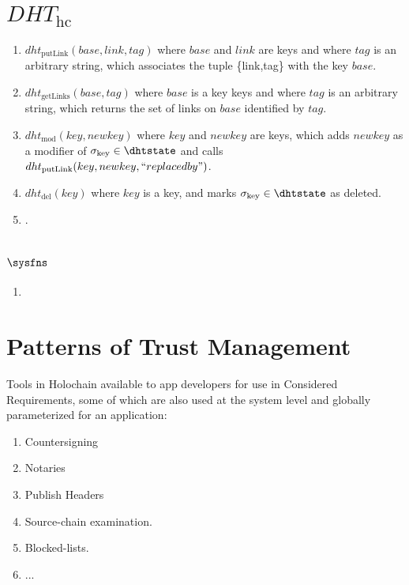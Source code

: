 \documentclass[twocolumn,showpacs,
  nofootinbib,aps,superscriptaddress,
  eqsecnum,prd,notitlepage,showkeys,10pt]{revtex4-1}
\begin{document}
\section{$DHT_\text{hc}$}
\label{apdx:dhtfn}
\begin{enumerate}

\item $dht_\text{putLink}(base,link,tag)$ where $base$ and $link$ are keys and where $tag$ is an arbitrary string, which associates the tuple \{link,tag\} with the key $base$.
\item $dht_\text{getLinks}(base,tag)$ where $base$ is a key keys and where $tag$ is an arbitrary string, which returns the set of links on $base$ identified by $tag$.
\item $dht_\text{mod}(key,newkey)$ where $key$ and $newkey$ are keys, which adds $newkey$ as a modifier of $\sigma_\text{key} \in \dhtstate$ and calls $dht_\text{putLink}(key,newkey,``replacedby")$.
\item $dht_\text{del}(key)$ where $key$ is a key, and marks $\sigma_\text{key} \in \dhtstate$ as deleted.
\item {}.
\end{enumerate}

\section{$\sysfns$}
\label{apdx:sysfn}
\begin{enumerate}
\item {}
\end{enumerate}

\section{Patterns of Trust Management}
\label{apdx:trust}

Tools in Holochain available to app developers for use in Considered Requirements, some of which are also used at the system level and globally parameterized for an application:
\begin{enumerate}
\item Countersigning 
\item Notaries 
\item Publish Headers  
\item Source-chain examination.  
\item Blocked-lists. 
\item ... 
\end {enumerate}
\end{document}
